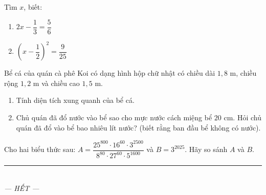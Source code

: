 \documentclass[12pt,a4paper]{article}
\begin{document}
\begin{ex}
Tìm $x$, biết:
\begin{enumerate}[label=\textbf{\alph*)}, leftmargin=0.8cm, itemsep=1pt]
\item $2x - \dfrac{1}{3} = \dfrac{5}{6}$
\item $\left(x - \dfrac{1}{2}\right)^2 = \dfrac{9}{25}$
\end{enumerate}
\end{ex}
\vspace{2mm}

\begin{ex}
Bể cá của quán cà phê Koi có dạng hình hộp chữ nhật có chiều dài $1{,}8\text{ m}$, chiều rộng $1{,}2\text{ m}$ và chiều cao $1{,}5\text{ m}$.
\begin{enumerate}[label=\textbf{\alph*)}, leftmargin=0.8cm, itemsep=1pt]
\item Tính diện tích xung quanh của bể cá.
\item Chủ quán đã đổ nước vào bể sao cho mực nước cách miệng bể $20\text{ cm}$. Hỏi chủ quán đã đổ vào bể bao nhiêu lít nước? (biết rằng ban đầu bể không có nước).
\end{enumerate}
\end{ex}
\vspace{2mm}

\begin{ex}
Cho hai biểu thức sau: $A = \dfrac{25^{800} \cdot 16^{60} \cdot 3^{2500}}{8^{80} \cdot 27^{60} \cdot 5^{1600}}$ và $B = 3^{2025}$. Hãy so sánh $A$ và $B$.
\end{ex}
\vspace{2mm}


\begin{center}
\rule{4cm}{0.4pt}\\
\textit{--- HẾT ---}
\end{center}
\end{document}
